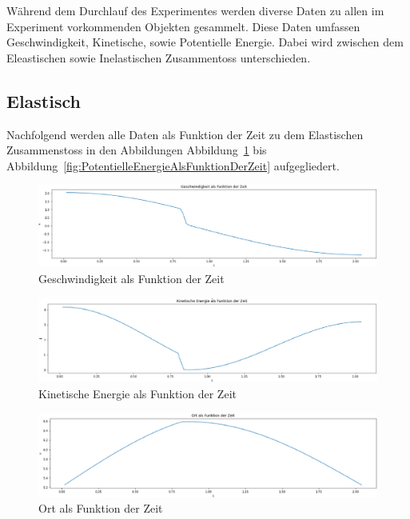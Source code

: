 \documentclass[../main.tex]{subfiles}
\begin{document}
    Während dem Durchlauf des Experimentes werden diverse Daten zu allen im Experiment vorkommenden
    Objekten gesammelt. Diese Daten umfassen Geschwindigkeit, Kinetische, sowie Potentielle Energie.
    Dabei wird zwischen dem Eleastischen sowie Inelastischen Zusammentoss unterschieden.
    \subsection{Elastisch}
    Nachfolgend werden alle Daten als Funktion der Zeit zu dem Elastischen Zusammenstoss in den Abbildungen
    Abbildung~\ref{fig:GeschwindigkeitAlsFunktionDerZeit} bis Abbildung~\ref{fig:PotentielleEnergieAlsFunktionDerZeit}
    aufgegliedert.

    \begin{figure}[H]
        \begin{center}
            \centerline{\includegraphics[width=155mm]{./images/Elastisch/GeschwindigkeitAlsFunktionDerZeit}}
            \caption{Geschwindigkeit als Funktion der Zeit}
            \label{fig:GeschwindigkeitAlsFunktionDerZeit}
        \end{center}
    \end{figure}

    \begin{figure}[H]
        \begin{center}
            \centerline{\includegraphics[width=155mm]{./images/Elastisch/KinetischeEnergieAlsFunktionDerZeit}}
            \caption{Kinetische Energie als Funktion der Zeit}
            \label{fig:KinetischeEnergieAlsFunktionDerZeit}
        \end{center}
    \end{figure}

    \begin{figure}[H]
        \begin{center}
            \centerline{\includegraphics[width=155mm]{./images/Elastisch/OrtAlsFunktionDerZeit}}
            \caption{Ort als Funktion der Zeit}
            \label{fig:OrtAlsFunktionDerZeit}
        \end{center}
    \end{figure}
\end{document}
